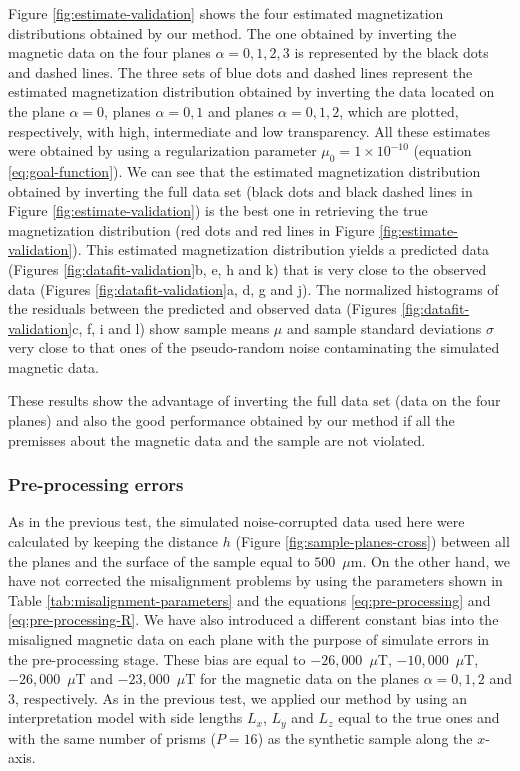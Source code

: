 \documentclass[draft,gc]{agutex}
\begin{document}
\begin{article}
Figure \ref{fig:estimate-validation} shows the four estimated 
magnetization distributions obtained by our method.
The one obtained by inverting the magnetic data on the 
four planes $\alpha = 0, 1, 2, 3$ is represented by the 
black dots and dashed lines. 
The three sets of blue dots and 
dashed lines represent the estimated magnetization distribution 
obtained by inverting the data located on the plane 
$\alpha = 0$, planes $\alpha = 0, 1$ and planes $\alpha = 0, 1, 2$,
which are plotted, respectively, with high, intermediate and low 
transparency.
All these estimates were obtained by using a regularization
parameter $\mu_{0} = 1 \times 10^{-10}$ (equation \ref{eq:goal-function}).
We can see that the estimated magnetization distribution 
obtained by inverting the full data set (black dots and black 
dashed lines in Figure \ref{fig:estimate-validation}) is the best one
in retrieving the true magnetization distribution
(red dots and red lines in Figure \ref{fig:estimate-validation}).
This estimated magnetization distribution yields a predicted data
(Figures \ref{fig:datafit-validation}b, e, h and k) that is very
close to the observed data (Figures \ref{fig:datafit-validation}a, 
d, g and j).
The normalized histograms of the residuals between the predicted and
observed data (Figures \ref{fig:datafit-validation}c, f, i and l) show
sample means $\mu$ and sample standard deviations $\sigma$
very close to that ones of the pseudo-random noise 
contaminating the simulated magnetic data.

These results show the advantage of inverting the full data set 
(data on the four planes) and
also the good performance obtained by our method
if all the premisses about the magnetic data and the sample 
are not violated.

\subsubsection{Pre-processing errors}

As in the previous test, the simulated noise-corrupted data 
used here were calculated by keeping the distance $h$ (Figure 
\ref{fig:sample-planes-cross}) between all the planes and the 
surface of the sample equal to $500$~$\mu$m.
On the other hand, we have not corrected the misalignment 
problems by using the parameters shown in 
Table \ref{tab:misalignment-parameters} and the equations 
\ref{eq:pre-processing} and \ref{eq:pre-processing-R}.
We have also introduced a different constant bias into the 
misaligned magnetic data on each plane with the purpose of
simulate errors in the pre-processing stage. These bias are
equal to $-26,000$~$\mu$T, $-10,000$~$\mu$T, $-26,000$~$\mu$T
and $-23,000$~$\mu$T for the magnetic data on the planes
$\alpha = 0, 1, 2$ and $3$, respectively.
As in the previous test, we applied our method by using
an interpretation model with side lengths $L_{x}$, $L_{y}$ 
and $L_{z}$ equal to the true ones and with the same number 
of prisms ($P = 16$) as the synthetic sample along the $x$-axis.


\end{article}
\end{document}
